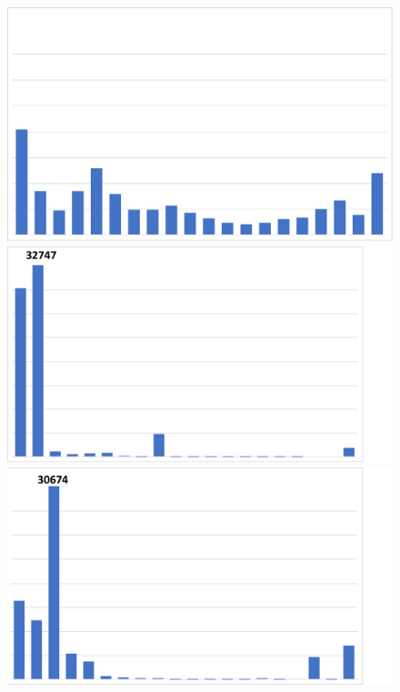 \begin{figure}
\begin{minipage}[t]{0.66\linewidth}
\begin{framed}
\begin{minipage}[t]{0.24\textwidth}
\vspace{-2mm}
\end{minipage}%
\hfill
\begin{minipage}[t]{0.24\textwidth}%
\includegraphics[width=0.95\linewidth]{results/nyx/Eul200_AvgL2.pdf}
\vspace{-2mm}
\end{minipage}
\begin{minipage}[t]{0.24\textwidth}%
\includegraphics[width=0.95\linewidth, trim={0cm 0cm 2.5cm 0cm}, clip]{results/nyx/Eul25_Max.pdf}
\vspace{-2mm}
\end{minipage}%
\hfill
\begin{minipage}[t]{0.24\textwidth}%
\includegraphics[width=0.95\linewidth, trim={0cm 0cm 2.5cm 0cm}, clip]{results/nyx/Eul50_Max.pdf}

\end{minipage}
\end{framed}
\end{minipage}
\end{figure}
